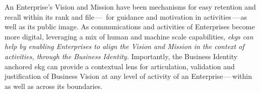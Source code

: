 %
%
An Enterprise’s Vision and Mission have been mechanisms for easy
retention and recall within its rank and file\,---\,%
for guidance and motivation in activities\,---\,as well as its public image.
As communications and activities of Enterprises become more digital, leveraging a mix of human and machine scale
capabilities, \textit{\glspl{ekg} can help by enabling Enterprises to align the Vision and Mission
in the context of activities, through the Business Identity.}
Importantly, the Business Identity anchored \gls{ekg} can provide a contextual lens for articulation,
validation and justification of Business Vision at any level of activity of an Enterprise\,---\,within as well as
across its boundaries.
